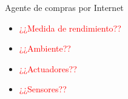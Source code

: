 \begin{frame}{Agente de compras por Internet}
    \begin{itemize}
        \item \textcolor{red}{¿¿Medida de rendimiento??}
        \item \textcolor{red}{¿¿Ambiente??}
        \item \textcolor{red}{¿¿Actuadores??}
        \item \textcolor{red}{¿¿Sensores??}
    \end{itemize}
\end{frame}
